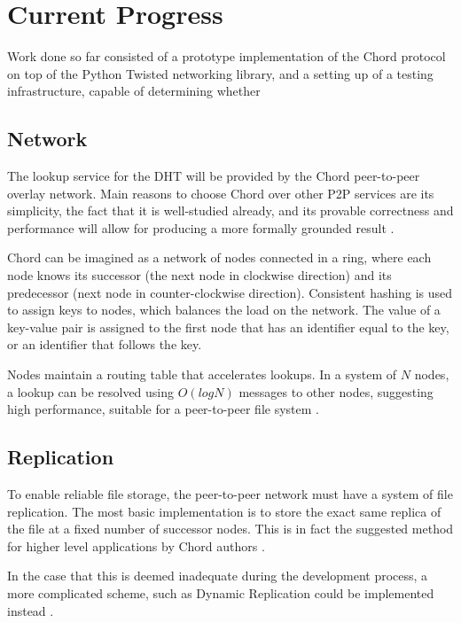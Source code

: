 \documentclass[a4paper, 11pt]{article}
\begin{document}
\section{Current Progress}

Work done so far consisted of a prototype implementation of the Chord protocol on top of the Python Twisted networking library, and a setting up of a testing infrastructure, capable of determining whether 
\subsection{Network}
The lookup service for the DHT will be provided by the Chord peer-to-peer overlay network. Main reasons to choose Chord over other P2P services are its simplicity, the fact that it is well-studied already, and its provable correctness and performance will allow for producing a more formally grounded result \cite{chord}. %

Chord can be imagined as a network of nodes connected in a ring, where each node knows its successor (the next node in clockwise direction) and its predecessor (next node in counter-clockwise direction). Consistent hashing is used to assign keys to nodes, which balances the load on the network. The value of a key-value pair is assigned to the first node that has an identifier equal to the key, or an identifier that follows the key. 

Nodes maintain a routing table that accelerates lookups. In a system of $N$ nodes, a lookup can be resolved using $O(log N)$ messages to other nodes, suggesting high performance, suitable for a peer-to-peer file system \cite{chord}.

\subsection{Replication}
To enable reliable file storage, the peer-to-peer network must have a system of file replication. The most basic implementation is to store the exact same replica of the file at a fixed number of successor nodes. This is in fact the suggested method for higher level applications by Chord authors \cite{chord}.

In the case that this is deemed inadequate during the development process, a more complicated scheme, such as Dynamic Replication could be implemented instead \cite{dhash}.
\end{document}
